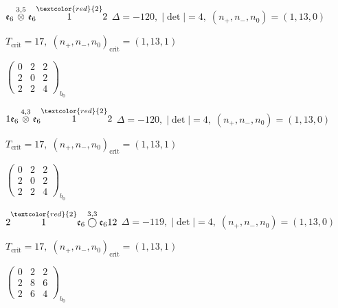\documentclass[10pt]{article}
\begin{document}
\smallskip

$\mathfrak{e}_6\overset{3,5}{\otimes}\mathfrak{e}_6\overset{\textcolor{red}{2}}{1}2$ \quad $\Delta=-120,\; |\det|=4,\; (n_+,n_-,n_0)=(1,13,0)$

\hspace{1em}$T_{\text{crit}}=17,\; (n_+,n_-,n_0)_{\text{crit}}=(1,13,1)$

\hspace{2em}$\left(\begin{smallmatrix}0 & 2 & 2 \\ 2 & 0 & 2 \\ 2 & 2 & 4\end{smallmatrix}\right)_{\!b_0}$

\smallskip

$1\mathfrak{e}_6\overset{4,3}{\otimes}\mathfrak{e}_6\overset{\textcolor{red}{2}}{1}2$ \quad $\Delta=-120,\; |\det|=4,\; (n_+,n_-,n_0)=(1,13,0)$

\hspace{1em}$T_{\text{crit}}=17,\; (n_+,n_-,n_0)_{\text{crit}}=(1,13,1)$

\hspace{2em}$\left(\begin{smallmatrix}0 & 2 & 2 \\ 2 & 0 & 2 \\ 2 & 2 & 4\end{smallmatrix}\right)_{\!b_0}$

\smallskip

$2\overset{\textcolor{red}{2}}{1}\mathfrak{e}_6\overset{3,3}{\bigcirc}\mathfrak{e}_612$ \quad $\Delta=-119,\; |\det|=4,\; (n_+,n_-,n_0)=(1,13,0)$

\hspace{1em}$T_{\text{crit}}=17,\; (n_+,n_-,n_0)_{\text{crit}}=(1,13,1)$

\hspace{2em}$\left(\begin{smallmatrix}0 & 2 & 2 \\ 2 & 8 & 6 \\ 2 & 6 & 4\end{smallmatrix}\right)_{\!b_0}$

\smallskip
\end{document}

